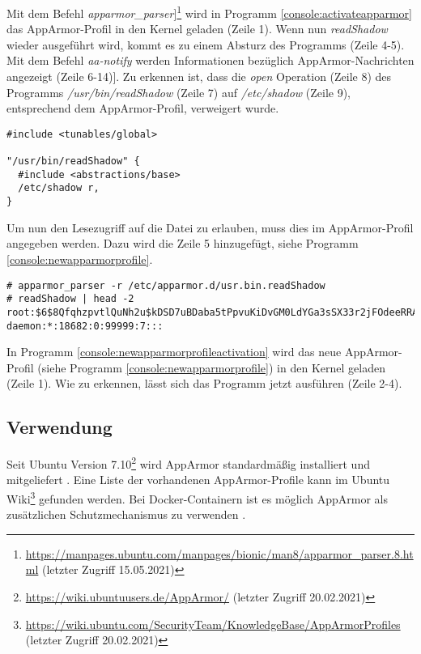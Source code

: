 Mit dem Befehl
\emph{apparmor\_parser}]\footnote{\url{https://manpages.ubuntu.com/manpages/bionic/man8/apparmor_parser.8.html}
(letzter Zugriff 15.05.2021)} wird in Programm
\ref{console:activateapparmor} das AppArmor-Profil in den Kernel
geladen (Zeile 1)\cite{man_apparmor_parser}. Wenn nun \emph{readShadow} wieder
ausgeführt wird, kommt es zu einem Absturz des Programms (Zeile 4-5). Mit
dem Befehl \emph{aa-notify} werden Informationen bezüglich
AppArmor-Nachrichten angezeigt (Zeile 6-14)]\cite{man_aa_notify}. Zu erkennen
ist, dass die \emph{open} Operation (Zeile 8) des Programms
\emph{/usr/bin/readShadow} (Zeile 7) auf \emph{/etc/shadow} (Zeile 9),
entsprechend dem AppArmor-Profil, verweigert wurde.

\begin{lstlisting}[label={console:newapparmorprofile},caption={Neues AppArmor-Profil}]
#include <tunables/global>

"/usr/bin/readShadow" {
  #include <abstractions/base>
  /etc/shadow r,
}
\end{lstlisting}

Um nun den Lesezugriff auf die Datei zu erlauben, muss dies im AppArmor-Profil
angegeben werden. Dazu wird die Zeile 5 hinzugefügt, siehe Programm
\ref{console:newapparmorprofile}.

\clearpage

\begin{lstlisting}[label={console:newapparmorprofileactivation},caption={Aktivierung des neuen AppArmor-Profils}]
# apparmor_parser -r /etc/apparmor.d/usr.bin.readShadow
# readShadow | head -2
root:$6$8QfqhzpvtlQuNh2u$kDSD7uBDaba5tPpvuKiDvGM0LdYGa3sSX33r2jFOdeeRRAfm1C8y.aS8eo.ogN.NeH8kOGxbM5vBfCQi0myr8.:18683:0:99999:7:::
daemon:*:18682:0:99999:7:::
\end{lstlisting}

In Programm \ref{console:newapparmorprofileactivation} wird das neue
AppArmor-Profil (siehe Programm \ref{console:newapparmorprofile}) in den Kernel
geladen (Zeile 1). Wie zu erkennen, lässt sich das Programm jetzt ausführen
(Zeile 2-4).

\subsection{Verwendung}
Seit Ubuntu Version 7.10\footnote{\url{https://wiki.ubuntuusers.de/AppArmor/}
(letzter Zugriff 20.02.2021)} wird AppArmor standardmä{\ss}ig installiert und
mitgeliefert \cite{ubuntu_apparmor}. Eine Liste der vorhandenen
AppArmor-Profile kann im Ubuntu
Wiki\footnote{\url{https://wiki.ubuntu.com/SecurityTeam/KnowledgeBase/AppArmorProfiles}
(letzter Zugriff 20.02.2021)} gefunden werden. Bei Docker-Containern ist es
möglich AppArmor als zusätzlichen Schutzmechanismus zu verwenden
\cite{docker_apparmor}.


